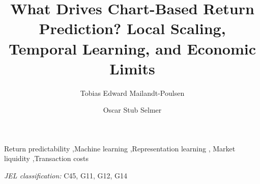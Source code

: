 \documentclass[final,1p,times,nonatbib]{elsarticle}
\newif\ifanonymous
\begin{document}
\begin{frontmatter}

\title{What Drives Chart-Based Return Prediction? Local Scaling, Temporal Learning, and Economic Limits}

\ifanonymous
\else
\author[au]{Tobias Edward Mailandt-Poulsen}
\author[au]{Oscar Stub Selmer}
\address[au]{Department of Economics and Business Economics, Aarhus University, Universitetsbyen 51, 8000 Aarhus C, Denmark}
\fi

\begin{abstract}

\end{abstract}

\begin{keyword}
Return predictability \sep Machine learning \sep Representation learning \sep
Market liquidity \sep Transaction costs
\end{keyword}

\end{frontmatter}

\noindent\textit{JEL classification:} C45, G11, G12, G14






\printbibliography[title={References}]
\end{document}
